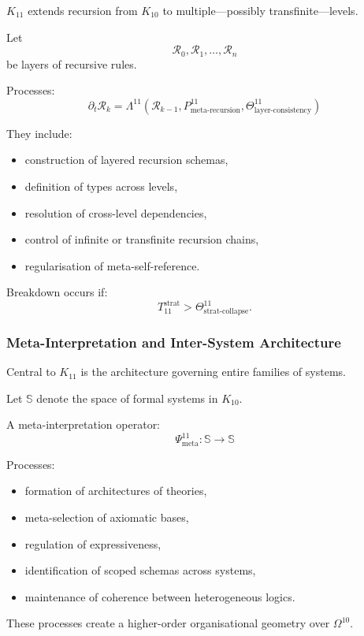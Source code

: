 $K_{11}$ extends recursion from $K_{10}$ to multiple—possibly transfinite—levels.

Let
\[
\mathcal{R}_0, \mathcal{R}_1, \ldots, \mathcal{R}_n
\]
be layers of recursive rules.

Processes:
\[
\partial_t \mathcal{R}_k
= \Lambda^{11}(\mathcal{R}_{k-1},
               P^{11}_{\text{meta-recursion}},
               \Theta^{11}_{\text{layer-consistency}})
\]

They include:
\begin{itemize}
    \item construction of layered recursion schemas,
    \item definition of types across levels,
    \item resolution of cross-level dependencies,
    \item control of infinite or transfinite recursion chains,
    \item regularisation of meta-self-reference.
\end{itemize}

Breakdown occurs if:
\[
T_{11}^{\text{strat}} > \Theta^{11}_{\text{strat-collapse}}.
\]

\subsubsection{Meta-Interpretation and Inter-System Architecture}

Central to $K_{11}$ is the architecture governing entire families of systems.

Let $\mathbb{S}$ denote the space of formal systems in $K_{10}$.

A meta-interpretation operator:
\[
\Psi^{11}_{\text{meta}} : \mathbb{S} \to \mathbb{S}
\]

Processes:
\begin{itemize}
    \item formation of architectures of theories,
    \item meta-selection of axiomatic bases,
    \item regulation of expressiveness,
    \item identification of scoped schemas across systems,
    \item maintenance of coherence between heterogeneous logics.
\end{itemize}

These processes create a higher-order organisational geometry over $\Omega^{10}$.

